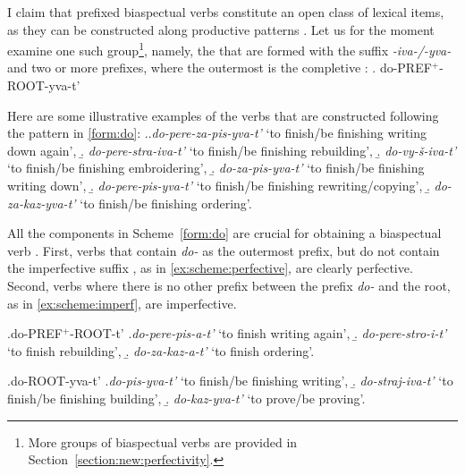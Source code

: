 I claim that prefixed biaspectual verbs  constitute an open class of lexical items, as they can be constructed along productive patterns  . Let us for the moment examine one such group\footnote{More groups of biaspectual verbs  are provided in Section~\ref{section:new:perfectivity}.}, namely, the  that are formed with the suffix \textit{-iva-/-yva-}   and two or more prefixes, where the outermost is the completive :
\ex. \label{form:do}do-PREF$^{+}$-ROOT-yva-t'

Here are some illustrative examples of the verbs that are constructed following the pattern in \ref{form:do}: 
\ex.\label{ex:prefixedverbs}\a.\textit{do-pere-za-pis-yva-t'} `to finish/be finishing writing down again', 
\b. \textit{do-pere-stra-iva-t'} `to finish/be finishing rebuilding',
\b. \textit{do-vy-\v{s}-iva-t'} `to finish/be finishing embroidering',
\b. \textit{do-za-pis-yva-t'} `to finish/be finishing writing down', 
\b. \textit{do-pere-pis-yva-t'} `to finish/be finishing rewriting/copying', 
\b. \textit{do-za-kaz-yva-t'} `to finish/be finishing ordering'.

All the components in Scheme~\ref{form:do} are crucial for obtaining a biaspectual verb . First, verbs that contain \textit{do-}   as the outermost prefix, but do not contain the imperfective suffix  , as in \ref{ex:scheme:perfective}, are clearly perfective. Second, verbs where there is no other prefix between the prefix \textit{do-}   and the root, as in \ref{ex:scheme:imperf}, are imperfective.

\ex.\label{ex:scheme:perfective}do-PREF$^{+}$-ROOT-t'
\a.\textit{do-pere-pis-a-t'}\textsuperscript{\PF} `to finish writing again', 
\b. \textit{do-pere-stro-i-t'}\textsuperscript{\PF} `to finish rebuilding',
\b. \textit{do-za-kaz-a-t'}\textsuperscript{\PF} `to finish ordering'.

\ex.\label{ex:scheme:imperf}do-ROOT-yva-t'
\a.\textit{do-pis-yva-t'}\textsuperscript{\IPF} `to finish/be finishing writing', 
\b. \textit{do-straj-iva-t'}\textsuperscript{\IPF} `to finish/be finishing building',
\b. \textit{do-kaz-yva-t'}\textsuperscript{\IPF} `to prove/be proving'.

